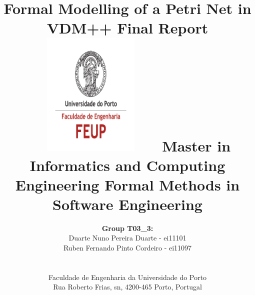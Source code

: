 \documentclass[a4paper]{article}
\begin{document}
\setlength{\textwidth}{16cm}
\setlength{\textheight}{22cm}

\title{\Huge\textbf{Formal Modelling of a Petri Net in VDM++}\linebreak\textbf{}\linebreak\linebreak
\Large\textbf{Final Report}\linebreak\linebreak
\includegraphics[height=6cm, width=7cm]{feup.pdf}\linebreak \linebreak
\Large{Master in Informatics and Computing Engineering} \linebreak \linebreak
\Large{Formal Methods in Software Engineering}\linebreak
}

\author{\textbf{Group T03\_3:}\\ Duarte Nuno Pereira Duarte - ei11101 \\ Ruben Fernando Pinto Cordeiro - ei11097 \\\linebreak\linebreak \\
 \\ Faculdade de Engenharia da Universidade do Porto \\ Rua Roberto Frias, s\/n, 4200-465 Porto, Portugal \linebreak\linebreak\linebreak
\linebreak\linebreak\vspace{1cm}}
\maketitle

\thispagestyle{empty}
\newpage
\tableofcontents
\end{document}
